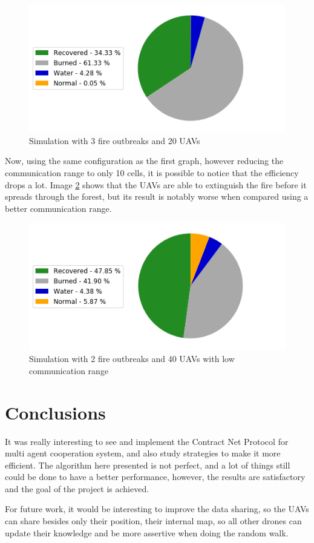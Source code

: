 \documentclass{article}
\begin{document}
\begin{figure}[!ht]
\centering
\includegraphics[scale=0.6]{fires_3_uavs_20_range_30}
\caption{Simulation with 3 fire outbreaks and 20 UAVs}
\label{fig:fig3}
\end{figure}

Now, using the same configuration as the first graph, however reducing the communication range to only 10 cells, it is possible to notice that the efficiency drops a lot. Image \ref{fig:fig4} shows that the UAVs are able to extinguish the fire before it spreads through the forest, but its result is notably worse when compared using a better communication range.

\begin{figure}[!ht]
\centering
\includegraphics[scale=0.6]{fires_2_uavs_40_range_10}
\caption{Simulation with 2 fire outbreaks and 40 UAVs with low communication range}
\label{fig:fig4}
\end{figure}

\section{Conclusions}
It was really interesting to see and implement the Contract Net Protocol for multi agent cooperation system, and also study strategies to make it more efficient. The algorithm here presented is not perfect, and a lot of things still could be done to have a better performance, however, the results are satisfactory and the goal of the project is achieved.

For future work, it would be interesting to improve the data sharing, so the UAVs can share besides only their position, their internal map, so all other drones can update their knowledge and be more assertive when doing the random walk.
\end{document}
